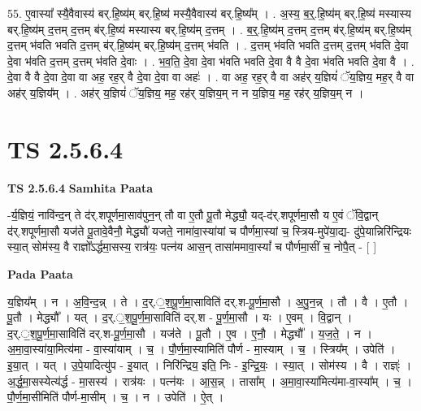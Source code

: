\documentclass[17pt]{extarticle}
\begin{document}
55. ए॒वास्या᳚ स्यै॒वैवास्य॑ बर्.हि॒ष्य॑म् बर्.हि॒ष्य॑ मस्यै॒वैवास्य॑ बर्.हि॒ष्य᳚म् । . अ॒स्य॒ ब॒र्॒.हि॒ष्य॑म् बर्.हि॒ष्य॑ मस्यास्य बर्.हि॒ष्य॑म् द॒त्तम् द॒त्तम् ब॑र्.हि॒ष्य॑ मस्यास्य बर्.हि॒ष्य॑म् द॒त्तम् । . ब॒र्॒.हि॒ष्य॑म् द॒त्तम् द॒त्तम् ब॑र्.हि॒ष्य॑म् बर्.हि॒ष्य॑म् द॒त्तम् भ॑वति भवति द॒त्तम् ब॑र्.हि॒ष्य॑म् बर्.हि॒ष्य॑म् द॒त्तम् भ॑वति । . द॒त्तम् भ॑वति भवति द॒त्तम् द॒त्तम् भ॑वति दे॒वा दे॒वा भ॑वति द॒त्तम् द॒त्तम् भ॑वति दे॒वाः । . भ॒व॒ति॒ दे॒वा दे॒वा भ॑वति भवति दे॒वा वै वै दे॒वा भ॑वति भवति दे॒वा वै । . दे॒वा वै वै दे॒वा दे॒वा वा अह॒ रह॒र् वै दे॒वा दे॒वा वा अहः॑ । . वा अह॒ रह॒र् वै वा अह॑र् य॒ज्ञियं॑ ॅय॒ज्ञिय॒ मह॒र् वै वा अह॑र् य॒ज्ञिय᳚म् । . अह॑र् य॒ज्ञियं॑ ॅय॒ज्ञिय॒ मह॒ रह॑र् य॒ज्ञिय॒म् न न य॒ज्ञिय॒ मह॒ रह॑र् य॒ज्ञिय॒म् न । \newline
\pagebreak
{}
\section*{ TS 2.5.6.4 }

\textbf{TS 2.5.6.4 } \newline
\textbf{Samhita Paata} \newline

-र्य॒ज्ञियं॒ नावि॑न्द॒न् ते द॑र्.शपूर्णमा॒साव॑पुन॒न् तौ वा ए॒तौ पू॒तौ मेद्ध्यौ॒ यद्-द॑र्.शपूर्णमा॒सौ य ए॒वं ॅवि॒द्वान् द॑र्.शपूर्णमा॒सौ यज॑ते पू॒तावे॒वैनौ॒ मेद्ध्यौ॑ यजते॒ नामा॑वा॒स्या॑यां च पौर्णमा॒स्यां च॒ स्त्रिय-मुपे॑या॒द्य- दु॑पे॒यान्निरि॑न्द्रियः स्या॒त् सोम॑स्य॒ वै राज्ञो᳚ऽर्द्धमा॒सस्य॒ रात्र॑यः॒ पत्न॑य आस॒न् तासा॑ममावा॒स्यां᳚ च पौर्णमा॒सीं च॒ नोपै॒त् - [  ] \newline

\textbf{Pada Paata} \newline

य॒ज्ञिय᳚म् । न । अ॒वि॒न्द॒न्न् । ते । द॒र्.॒श॒पू॒र्ण॒मा॒साविति॑ दर्.श-पू॒र्ण॒मा॒सौ । अ॒पु॒न॒न्न् । तौ । वै । ए॒तौ । पू॒तौ । मेद्ध्यौ᳚ । यत् । द॒र्.॒श॒पू॒र्ण॒मा॒साविति॑ दर्.श - पू॒र्ण॒मा॒सौ । यः । ए॒वम् । वि॒द्वान् । द॒र्.॒श॒पू॒र्ण॒मा॒साविति॑ दर्.श-पू॒र्ण॒मा॒सौ । यज॑ते । पू॒तौ । ए॒व । ए॒नौ॒ । मेद्ध्यौ᳚ । य॒ज॒ते॒ । न । अ॒मा॒वा॒स्या॑या॒मित्य॑मा - वा॒स्या॑याम् । च॒ । पौ॒र्ण॒मा॒स्यामिति॑ पौर्ण - मा॒स्याम् । च॒ । स्त्रिय᳚म् । उपेति॑ । इ॒या॒त् । यत् । उ॒पे॒यादित्यु॑प - इ॒यात् । निरि॑न्द्रिय॒ इति॒ निः - इ॒न्द्रि॒यः॒ । स्या॒त् । सोम॑स्य । वै । राज्ञ्ः॑ । अ॒र्द्ध॒मा॒सस्येत्य॑र्द्ध - मा॒सस्य॑ । रात्र॑यः । पत्न॑यः । आ॒स॒न्न् । तासा᳚म् । अ॒मा॒वा॒स्या॑मित्य॑मा-वा॒स्या᳚म् । च॒ । पौ॒र्ण॒मा॒सीमिति॑ पौर्ण-मा॒सीम् । च॒ । न । उपेति॑ । ऐ॒त् ।  \newline
\end{document}
